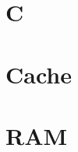 \documentclass[main.tex,fontsize=8pt,paper=a4,paper=landscape,DIV=calc,]{scrartcl}
\begin{document}
\begin{multicols*}{4}
\lstset{
    language=c,
    style=code,
}

\section{C}


\section{Cache}


\section{RAM}

\end{multicols*}
\end{document}
